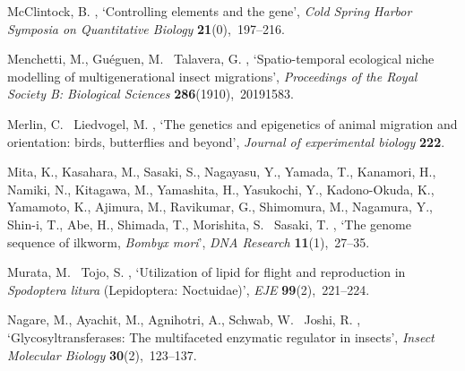 \documentclass[twocolumn]{bmcart}%
\begin{document}
\begin{backmatter}
\begin{thebibliography}{xx}
McClintock, B.  \harvardyearright , `Controlling elements
  and the gene', {\em Cold Spring Harbor Symposia on Quantitative Biology} {\bf
  21}(0),~197--216.

Menchetti, M., Guéguen, M. \harvardand\ Talavera, G.  \harvardyearleft
  2019\harvardyearright , `Spatio-temporal ecological niche modelling of
  multigenerational insect migrations', {\em Proceedings of the Royal Society
  B: Biological Sciences} {\bf 286}(1910),~20191583.

Merlin, C. \harvardand\ Liedvogel, M.  \harvardyearright ,
  `The genetics and epigenetics of animal migration and orientation: birds,
  butterflies and beyond', {\em Journal of experimental biology} {\bf 222}.

Mita, K., Kasahara, M., Sasaki, S., Nagayasu, Y., Yamada, T., Kanamori, H.,
  Namiki, N., Kitagawa, M., Yamashita, H., Yasukochi, Y., Kadono-Okuda, K.,
  Yamamoto, K., Ajimura, M., Ravikumar, G., Shimomura, M., Nagamura, Y.,
  Shin-i, T., Abe, H., Shimada, T., Morishita, S. \harvardand\ Sasaki, T.
  \harvardyearleft 2004\harvardyearright , `The {{genome sequence}} of
  {{ilkworm}}, \textit{{{Bombyx}} mori}', {\em DNA Research} {\bf
  11}(1),~27--35.

Murata, M. \harvardand\ Tojo, S.  \harvardyearright ,
  `Utilization of lipid for flight and reproduction in \textit{{{Spodoptera}}
  litura} ({{Lepidoptera}}: {{Noctuidae}})', {\em EJE} {\bf 99}(2),~221--224.

Nagare, M., Ayachit, M., Agnihotri, A., Schwab, W. \harvardand\ Joshi, R.
  \harvardyearright , `Glycosyltransferases: The
  multifaceted enzymatic regulator in insects', {\em Insect Molecular Biology}
  {\bf 30}(2),~123--137.


\end{thebibliography}
\end{backmatter}
\end{document}
